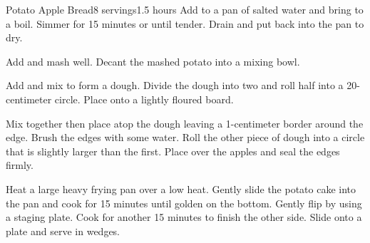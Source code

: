 \documentclass[../Cookbook.tex]{subfiles}
\begin{document}
\begin{recipe}[PotatoAppleBread]{Potato Apple Bread}{8 servings}{1.5 hours}
Add to a pan of salted water and bring to a boil.
Simmer for 15 minutes or until tender.
Drain and put back into the pan to dry.

Add and mash well.
Decant the mashed potato into a mixing bowl.

Add and mix to form a dough.
Divide the dough into two and roll half into a 20-centimeter circle.
Place onto a lightly floured board.

Mix together then place atop the dough leaving a 1-centimeter border around the edge.
Brush the edges with some water.
Roll the other piece of dough into a circle that is slightly larger than the first.
Place over the apples and seal the edges firmly.

Heat a large heavy frying pan over a low heat.
Gently slide the potato cake into the pan and cook for 15 minutes until golden on the bottom.
Gently flip by using a staging plate.
Cook for another 15 minutes to finish the other side.
Slide onto a plate and serve in wedges.

\end{recipe}
\end{document}
